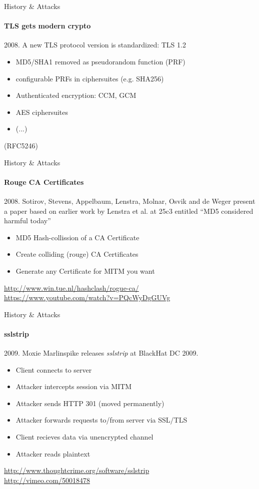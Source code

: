 \documentclass[hyperref={draft}]{beamer}
\begin{document}
\begin{frame}{History \& Attacks}
  \framesubtitle{TLS gets modern crypto}
  2008. A new TLS protocol version is standardized: TLS 1.2
  \begin{itemize}
    \item MD5/SHA1 removed as pseudorandom function (PRF)
    \item configurable PRFs in ciphersuites (e.g. SHA256)
    \item Authenticated encryption: CCM, GCM
    \item AES ciphersuites
    \item (...)
  \end{itemize}
   (RFC5246)
\end{frame}

\begin{frame}{History \& Attacks}
  \framesubtitle{Rouge CA Certificates}
  2008. Sotirov, Stevens, Appelbaum, Lenstra, Molnar, Osvik and de Weger present a paper based on earlier work by Lenstra et al. at 25c3 entitled ``MD5 considered harmful today''

  \begin{itemize}
    \item MD5 Hash-collission of a CA Certificate
    \item Create colliding (rouge) CA Certificates
    \item Generate any Certificate for MITM you want
  \end{itemize}

  \vspace{60px}

  \tiny
  \url{http://www.win.tue.nl/hashclash/rogue-ca/}\\
  \url{https://www.youtube.com/watch?v=PQcWyDgGUVg}\\
\end{frame}

\begin{frame}{History \& Attacks}
  \framesubtitle{sslstrip}
  2009. Moxie Marlinspike releases \emph{sslstrip} at BlackHat DC 2009.

  \begin{itemize}
    \item Client connects to server
    \item Attacker intercepts session via MITM
    \item Attacker sends HTTP 301 (moved permanently)
    \item Attacker forwards requests to/from server via SSL/TLS
    \item Client recieves data via unencrypted channel
    \item Attacker reads plaintext
  \end{itemize}
  
  \vspace{50px}

  \tiny
  \url{http://www.thoughtcrime.org/software/sslstrip}\\
  \url{http://vimeo.com/50018478}
\end{frame}
\end{document}
